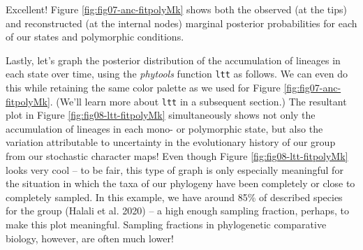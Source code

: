 \documentclass[fleqn,10pt,lineno]{wlpeerj} %
\begin{document}
Excellent! Figure \ref{fig:fig07-anc-fitpolyMk} shows both the observed (at the tips) and reconstructed (at the internal nodes) marginal posterior probabilities for each of our states and polymorphic conditions.

Lastly, let's graph the posterior distribution of the accumulation of lineages in each state over time, using the \emph{phytools} function \texttt{ltt} as follows. We can even do this while retaining the same color palette as we used for Figure \ref{fig:fig07-anc-fitpolyMk}. (We'll learn more about \texttt{ltt} in a subsequent section.) The resultant plot in Figure \ref{fig:fig08-ltt-fitpolyMk} simultaneously shows not only the accumulation of lineages in each mono- or polymorphic state, but also the variation attributable to uncertainty in the evolutionary history of our group from our stochastic character maps! Even though Figure \ref{fig:fig08-ltt-fitpolyMk} looks very cool -- to be fair, this type of graph is only especially meaningful for the situation in which the taxa of our phylogeny have been completely or close to completely sampled. In this example, we have around 85\% of described species for the group (Halali et al. 2020) -- a high enough sampling fraction, perhaps, to make this plot meaningful. Sampling fractions in phylogenetic comparative biology, however, are often much lower!
\end{document}
